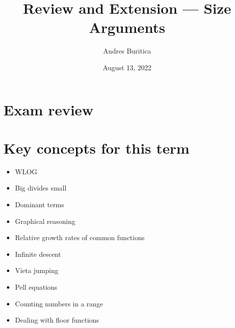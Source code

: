 \documentclass{article}
\title{Review and Extension --- Size Arguments}
\author{Andres Buritica}
\date{August 13, 2022}
\begin{document}
\maketitle
\section{Exam review}
\section{Key concepts for this term}
  \begin{itemize}
    \item WLOG
    \item Big divides small
    \item Dominant terms
    \item Graphical reasoning
    \item Relative growth rates of common functions
    \item Infinite descent
    \item Vieta jumping
    \item Pell equations
    \item Counting numbers in a range
    \item Dealing with floor functions
  \end{itemize}
\end{document}
